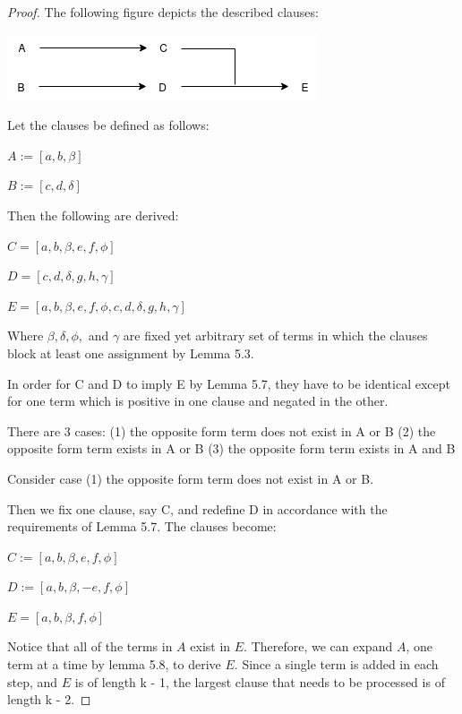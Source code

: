 \documentclass[manuscript]{acmart}
\begin{document}
    \begin{proof}
        The following figure depicts the described clauses:

        \includegraphics[scale=0.8]{519a}

        Let the clauses be defined as follows:

        $A := [a, b, \beta]$

        $B := [c, d, \delta]$

        Then the following are derived:

        $C = [a, b, \beta, e, f, \phi]$

        $D = [c, d, \delta, g, h, \gamma]$

        $E = [a, b, \beta, e, f, \phi, c, d, \delta, g, h, \gamma]$

        Where $\beta, \delta, \phi,$ and $\gamma$ are fixed yet arbitrary
        set of terms in which the clauses block at least one assignment
        by Lemma 5.3.

        In order for C and D to imply E by Lemma 5.7, they have to be
        identical except for one term which is positive in one clause
        and negated in the other.

        There are 3 cases:
        (1) the opposite form term does not exist in A or B
        (2) the opposite form term exists in A or B
        (3) the opposite form term exists in A and B
        
        Consider case (1) the opposite form term does not exist in A or B.

        Then we fix one clause, say C, and redefine D in accordance with
        the requirements of Lemma 5.7. The clauses become:

        $C := [a, b, \beta, e, f, \phi]$

        $D := [a, b, \beta, -e, f, \phi]$

        $E = [a, b, \beta, f, \phi]$

        Notice that all of the terms in $A$ exist in $E$. Therefore, we
        can expand $A$, one term at a time by lemma 5.8, to derive
        $E$. Since a single term is added in each step, and $E$ is of length k - 1,
        the largest clause that needs to be processed is of length k - 2.


\end{proof}
\end{document}
